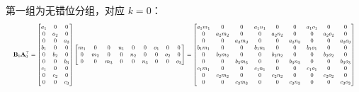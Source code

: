 ﻿\documentclass[UTF8,a4paper,11pt]{ctexart}
\begin{document}
第一组为无错位分组，对应 $k=0$：
\[
\resizebox{\linewidth}{!}{$\displaystyle
\mathbf{B}_0 \mathbf{A}_0^\top =
\begin{bmatrix}
a_1 & 0 & 0 \\ 0 & a_2 & 0 \\ 0 & 0 & a_3 \\
b_1 & 0 & 0 \\ 0 & b_2 & 0 \\ 0 & 0 & b_3 \\
c_1 & 0 & 0 \\ 0 & c_2 & 0 \\ 0 & 0 & c_3
\end{bmatrix}
\begin{bmatrix}
m_1 & 0 & 0 & n_1 & 0 & 0 & o_1 & 0 & 0 \\
0 & m_2 & 0 & 0 & n_2 & 0 & 0 & o_2 & 0 \\
0 & 0 & m_3 & 0 & 0 & n_3 & 0 & 0 & o_3
\end{bmatrix}
=
\begin{bmatrix}
a_1 m_1 & 0 & 0 & a_1 n_1 & 0 & 0 & a_1 o_1 & 0 & 0 \\
0 & a_2 m_2 & 0 & 0 & a_2 n_2 & 0 & 0 & a_2 o_2 & 0 \\
0 & 0 & a_3 m_3 & 0 & 0 & a_3 n_3 & 0 & 0 & a_3 o_3 \\
b_1 m_1 & 0 & 0 & b_1 n_1 & 0 & 0 & b_1 o_1 & 0 & 0 \\
0 & b_2 m_2 & 0 & 0 & b_2 n_2 & 0 & 0 & b_2 o_2 & 0 \\
0 & 0 & b_3 m_3 & 0 & 0 & b_3 n_3 & 0 & 0 & b_3 o_3 \\
c_1 m_1 & 0 & 0 & c_1 n_1 & 0 & 0 & c_1 o_1 & 0 & 0 \\
0 & c_2 m_2 & 0 & 0 & c_2 n_2 & 0 & 0 & c_2 o_2 & 0 \\
0 & 0 & c_3 m_3 & 0 & 0 & c_3 n_3 & 0 & 0 & c_3 o_3
\end{bmatrix}
$}
\]
\end{document}
